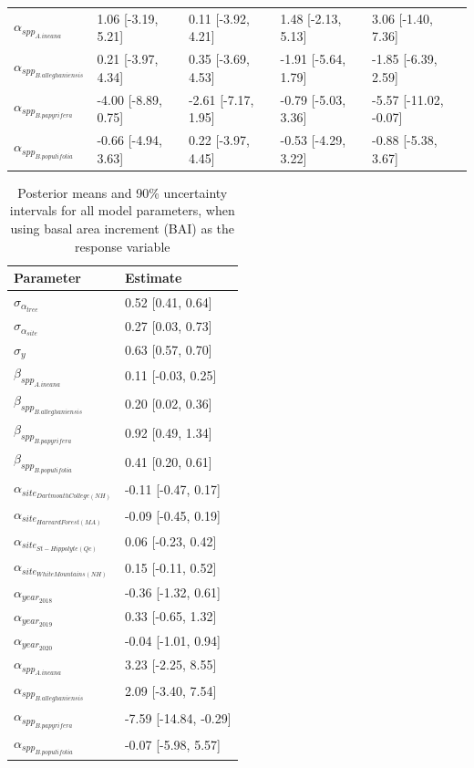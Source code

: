 \documentclass{article}\usepackage[]{graphicx}\usepackage[]{xcolor}
\begin{document}
\begin{table}[ht]
\begin{tabular}{lllll}
  $\alpha_{spp_{A. incana}}$ & 1.06 [-3.19, 5.21] & 0.11 [-3.92, 4.21] & 1.48 [-2.13, 5.13] & 3.06 [-1.40, 7.36] \\ 
  $\alpha_{spp_{B. alleghaniensis}}$ & 0.21 [-3.97, 4.34] & 0.35 [-3.69, 4.53] & -1.91 [-5.64, 1.79] & -1.85 [-6.39, 2.59] \\ 
  $\alpha_{spp_{B. papyrifera}}$ & -4.00 [-8.89, 0.75] & -2.61 [-7.17, 1.95] & -0.79 [-5.03, 3.36] & -5.57 [-11.02, -0.07] \\ 
  $\alpha_{spp_{B. populifolia}}$ & -0.66 [-4.94, 3.63] & 0.22 [-3.97, 4.45] & -0.53 [-4.29, 3.22] & -0.88 [-5.38, 3.67] \\ 
   \hline
\end{tabular}
\end{table}


\begin{table}[ht]
\centering
\caption{Posterior means and 90\% uncertainty intervals for all model parameters, when using basal area increment (BAI) as the response variable} 
\label{tab:BAItab}
\begin{tabular}{ll}
  \hline
Parameter & Estimate \\ 
  \hline
$\sigma_{\alpha_{tree}}$ & 0.52 [0.41, 0.64] \\ 
  $\sigma_{\alpha_{site}}$ & 0.27 [0.03, 0.73] \\ 
  $\sigma_{y}$ & 0.63 [0.57, 0.70] \\ 
  $\beta_{spp_{A. incana}}$ & 0.11 [-0.03, 0.25] \\ 
  $\beta_{spp_{B. alleghaniensis}}$ & 0.20 [0.02, 0.36] \\ 
  $\beta_{spp_{B. papyrifera}}$ & 0.92 [0.49, 1.34] \\ 
  $\beta_{spp_{B. populifolia}}$ & 0.41 [0.20, 0.61] \\ 
  $\alpha_{site_{Dartmouth College (NH)}}$ & -0.11 [-0.47, 0.17] \\ 
  $\alpha_{site_{Harvard Forest (MA)}}$ & -0.09 [-0.45, 0.19] \\ 
  $\alpha_{site_{St-Hippolyte (Qc)}}$ & 0.06 [-0.23, 0.42] \\ 
  $\alpha_{site_{White Mountains (NH)}}$ & 0.15 [-0.11, 0.52] \\ 
  $\alpha_{year_{2018}}$ & -0.36 [-1.32, 0.61] \\ 
  $\alpha_{year_{2019}}$ & 0.33 [-0.65, 1.32] \\ 
  $\alpha_{year_{2020}}$ & -0.04 [-1.01, 0.94] \\ 
  $\alpha_{spp_{A. incana}}$ & 3.23 [-2.25, 8.55] \\ 
  $\alpha_{spp_{B. alleghaniensis}}$ & 2.09 [-3.40, 7.54] \\ 
  $\alpha_{spp_{B. papyrifera}}$ & -7.59 [-14.84, -0.29] \\ 
  $\alpha_{spp_{B. populifolia}}$ & -0.07 [-5.98, 5.57] \\ 
   \hline
\end{tabular}
\end{table}


\clearpage

 
\end{document}
